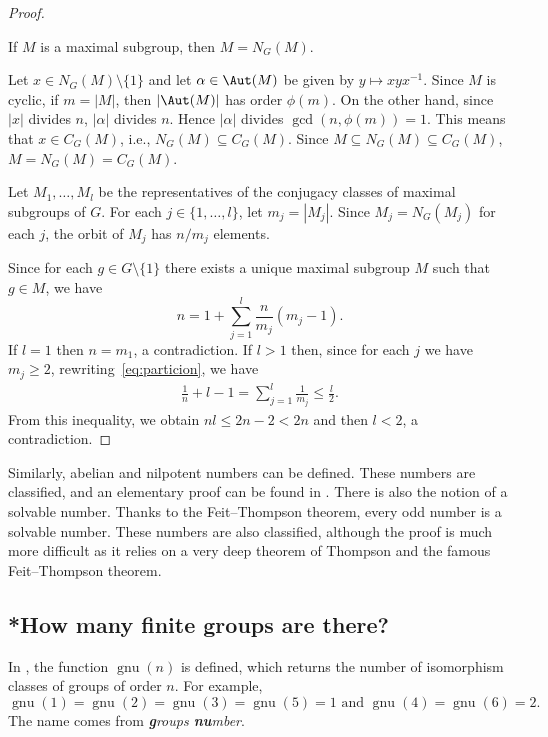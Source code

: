 \begin{proof}
    \begin{claim}
    If $M$ is a maximal subgroup, then $M=N_G(M)$.
    \end{claim}

    Let $x\in N_G(M)\setminus\{1\}$ and let $\alpha\in\Aut(M)$ be given by $y\mapsto xyx^{-1}$. Since $M$ is cyclic, if $m=|M|$, then $|\Aut(M)|$ has order $\phi(m)$. On the other hand, since $|x|$ divides $n$, $|\alpha|$ divides $n$. Hence $|\alpha|$ divides $\gcd(n,\phi(m))=1$. This means that $x\in C_G(M)$, i.e., $N_G(M)\subseteq C_G(M)$. Since $M\subseteq N_G(M)\subseteq C_G(M)$, $M=N_G(M)=C_G(M)$.

    Let $M_1,\dots,M_l$ be the representatives of the conjugacy classes of maximal subgroups of $G$. For each $j\in\{1,\dots,l\}$, let $m_j=|M_j|$. Since $M_{j}=N_G(M_j)$ for each $j$, the orbit of $M_j$ has $n/m_j$ elements.

    Since for each $g\in G\setminus\{1\}$ there exists a unique maximal subgroup $M$ such that $g\in M$, we have
    \begin{equation}
    \label{eq:particion}
    n=1+\sum_{j=1}^l \frac{n}{m_j}(m_j-1).
    \end{equation}
    If $l=1$ then $n=m_1$, a contradiction. If $l>1$ then, since for each $j$ we have $m_j\geq2$, rewriting~\eqref{eq:particion}, we have
    \begin{align*}
    \frac{1}{n}+l-1=\sum_{j=1}^l\frac{1}{m_j}\leq\frac{l}{2}.
    \end{align*}
    From this inequality, we obtain $nl\leq 2n-2<2n$ and then $l<2$, a contradiction. 
\end{proof}

Similarly, abelian and nilpotent numbers can be defined. These numbers are classified, and an elementary proof can be found in \cite{MR1786236}. There is also the notion of a solvable number. Thanks to the Feit--Thompson theorem, every odd number is a solvable number. These numbers are also classified, although the proof is much more difficult as it relies on a very deep theorem of Thompson and the famous Feit--Thompson theorem.

\subsection{*How many finite groups are there?}

In \cite{MR2410121}, the function $\operatorname{gnu}(n)$ is defined, which returns the number of isomorphism classes of groups of order $n$. For example, \[
\operatorname{gnu}(1)=\operatorname{gnu}(2)=\operatorname{gnu}(3)=\operatorname{gnu}(5)=1\text{ and }\operatorname{gnu}(4)=\operatorname{gnu}(6)=2.
\]
The name comes from \emph{\textbf{g}roups \textbf{nu}mber}.

